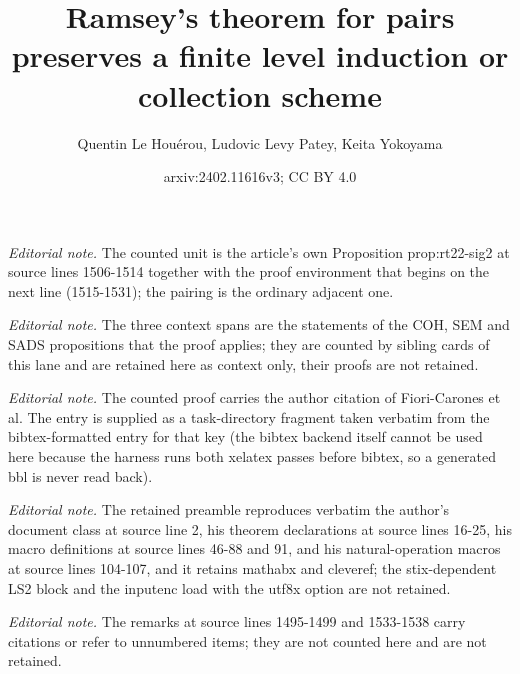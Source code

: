 \documentclass{article}
\title{Ramsey's theorem for pairs preserves a finite level induction or collection scheme}
\author{Quentin Le Houérou, Ludovic Levy Patey, Keita Yokoyama}
\date{arxiv:2402.11616v3; CC BY 4.0}
\numberwithin{theorem}{section}
\begin{document}
\maketitle
\noindent\textit{Editorial note.} The counted unit is the article's own Proposition prop:rt22-sig2 at source lines 1506-1514 together with the proof environment that begins on the next line (1515-1531); the pairing is the ordinary adjacent one.\par\medskip
\noindent\textit{Editorial note.} The three context spans are the statements of the COH, SEM and SADS propositions that the proof applies; they are counted by sibling cards of this lane and are retained here as context only, their proofs are not retained.\par\medskip
\noindent\textit{Editorial note.} The counted proof carries the author citation of Fiori-Carones et al. The entry is supplied as a task-directory fragment taken verbatim from the bibtex-formatted entry for that key (the bibtex backend itself cannot be used here because the harness runs both xelatex passes before bibtex, so a generated bbl is never read back).\par\medskip
\noindent\textit{Editorial note.} The retained preamble reproduces verbatim the author's document class at source line 2, his theorem declarations at source lines 16-25, his macro definitions at source lines 46-88 and 91, and his natural-operation macros at source lines 104-107, and it retains mathabx and cleveref; the stix-dependent LS2 block and the inputenc load with the utf8x option are not retained.\par\medskip
\noindent\textit{Editorial note.} The remarks at source lines 1495-1499 and 1533-1538 carry citations or refer to unnumbered items; they are not counted here and are not retained.\par\medskip
\end{document}
